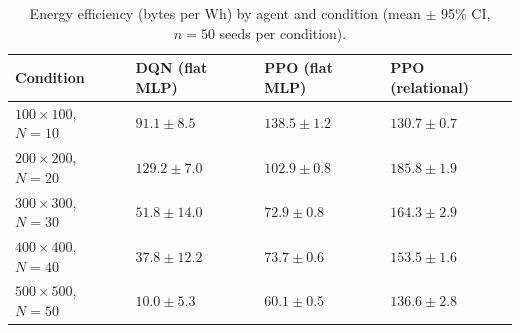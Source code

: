 \begin{table}[H]
\centering
\caption{Energy efficiency (bytes per Wh) by agent and condition (mean $\pm$ 95\% CI, $n{=}50$ seeds per condition).}
\label{tab:energy_efficiency}
\small
\begin{tabularx}{\textwidth}{l X X X}
\toprule
\textbf{Condition} & \textbf{DQN (flat MLP)} & \textbf{PPO (flat MLP)} & \textbf{PPO (relational)} \\
\midrule
$100{\times}100$, $N{=}10$ & $91.1{\pm}8.5$   & $138.5{\pm}1.2$ & $130.7{\pm}0.7$ \\
$200{\times}200$, $N{=}20$ & $129.2{\pm}7.0$  & $102.9{\pm}0.8$ & $185.8{\pm}1.9$ \\
$300{\times}300$, $N{=}30$ & $51.8{\pm}14.0$  & $72.9{\pm}0.8$  & $\mathbf{164.3{\pm}2.9}$ \\
$400{\times}400$, $N{=}40$ & $37.8{\pm}12.2$  & $73.7{\pm}0.6$  & $\mathbf{153.5{\pm}1.6}$ \\
$500{\times}500$, $N{=}50$ & $10.0{\pm}5.3$   & $60.1{\pm}0.5$  & $\mathbf{136.6{\pm}2.8}$ \\
\bottomrule
\end{tabularx}
\end{table}
